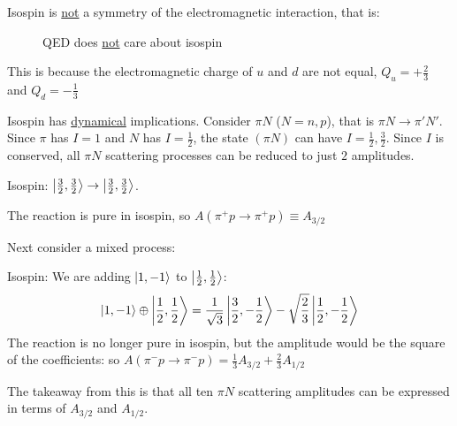 \begin{note}
  Isospin is \underline{not} a symmetry of the electromagnetic interaction, that is:
  \begin{figure}[H]
  \centering
  \caption{QED does \underline{not} care about isospin}
  \label{fig:isospin}
\end{figure}
This is because the electromagnetic charge of $u$ and $d$ are not equal, $Q_u=+\frac23$ and $Q_d=-\frac13$
\end{note}
Isospin has \underline{dynamical} implications. Consider $\pi N$ ($N=n,p$), that is $\pi N\to\pi'N'$. Since $\pi$ has $I=1$ and $N$ has $I=\frac12$, the state $(\pi N)$ can have $I=\frac12,\frac32$. Since $I$ is conserved, all $\pi N$ scattering processes can be reduced to just $2$ amplitudes.

\begin{example}[$\pi^+p\to\pi^+p$]
  Isospin: $\ket{\frac32,\frac32}\to\ket{\frac32,\frac32}$.

  The reaction is pure in isospin, so $A(\pi^+p\to\pi^+p)\equiv A_{3/2}$
\end{example}
Next consider a mixed process:
\begin{example}[$\pi^-p\to\pi^-p$]
  Isospin: We are adding $\ket{1,-1}$ to $\ket{\frac12,\frac12}$:
  \begin{align*}
    \ket{1,-1}\oplus\ket{\frac12,\frac12}
    =\frac1{\sqrt{3}}\ket{\frac32,-\frac12}
    -\sqrt{\frac23}\ket{\frac12,-\frac12}
  \end{align*}
  The reaction is no longer pure in isospin, but the amplitude would be the square of the coefficients: so $A(\pi^-p\to\pi^-p)= \frac13A_{3/2}+\frac23A_{1/2}$
\end{example}
The takeaway from this is that all ten $\pi N$ scattering amplitudes can be expressed in terms of $A_{3/2}$ and $A_{1/2}$.

